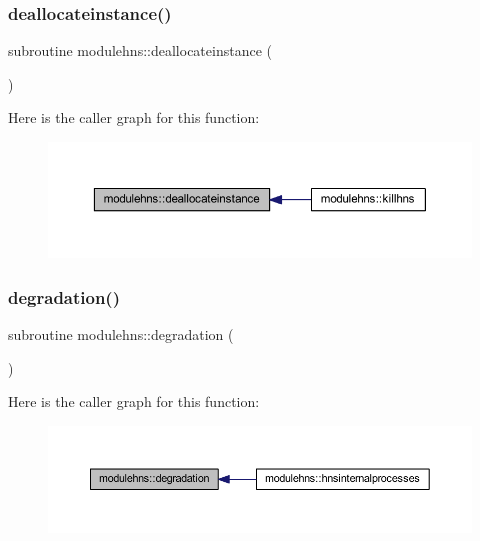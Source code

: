 \subsubsection{\texorpdfstring{deallocateinstance()}{deallocateinstance()}}
{\footnotesize\ttfamily subroutine modulehns\+::deallocateinstance (\begin{DoxyParamCaption}{ }\end{DoxyParamCaption})\hspace{0.3cm}{\ttfamily [private]}}

Here is the caller graph for this function\+:\nopagebreak
\begin{figure}[H]
\begin{center}
\leavevmode
\includegraphics[width=350pt]{namespacemodulehns_a3c016aeb7936c47cd4071d8b9aa3ac75_icgraph}
\end{center}
\end{figure}
\mbox{\label{namespacemodulehns_a378c8e88593c5f512652c5189a9a9729}} 
\subsubsection{\texorpdfstring{degradation()}{degradation()}}
{\footnotesize\ttfamily subroutine modulehns\+::degradation (\begin{DoxyParamCaption}{ }\end{DoxyParamCaption})\hspace{0.3cm}{\ttfamily [private]}}

Here is the caller graph for this function\+:\nopagebreak
\begin{figure}[H]
\begin{center}
\leavevmode
\includegraphics[width=350pt]{namespacemodulehns_a378c8e88593c5f512652c5189a9a9729_icgraph}
\end{center}
\end{figure}
\mbox{\label{namespacemodulehns_a2b9b45c82fa5451490cda26d15845a31}} 
